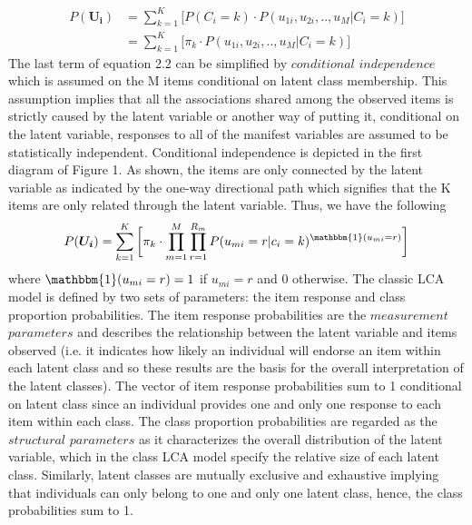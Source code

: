 \begin{align}
P(\bm{U_{i}}) &= \sum_{k=1}^{K} \bigg[ P(C_{i}=k) \cdot P(u_{1i},u_{2i},..,u_{M}|C_{i}=k)\bigg] \\
&=\sum_{k=1}^{K} \bigg[ \pi_{k} \cdot P(u_{1i},u_{2i},..,u_{M}|C_{i}=k)\bigg]
\end{align}
The last term of equation 2.2 can be simplified by $conditional$ $independence$ which is assumed on the M items conditional on latent class membership. This assumption implies that all the associations shared among the observed items is strictly caused by the latent variable or another way of putting it, conditional on the latent variable, responses to all of the manifest variables are assumed to be statistically independent. Conditional independence is depicted in the first diagram of Figure 1. As shown, the items are only connected by the latent variable as indicated by the one-way directional path which signifies that the K items are only related through the latent variable. Thus, we have the following 
\begin{align}
P(\bm{U_{i}}) = \sum_{k=1}^{K} \bigg[ \pi_{k} \cdot  \prod_{m=1}^{M}\prod_{r=1}^{R_{m}} P(u_{mi}=r|c_{i}=k)^{\mathbbm{1}(u_{mi} = r)} \bigg ]
\end{align}
where $\mathbbm{1}(u_{mi} = r)=1$ if $u_{mi}=r$ and $0$ otherwise. The classic LCA model is defined by two sets of parameters: the item response and class proportion probabilities. The item response probabilities are the $measurement$ $parameters$ and describes the relationship between the latent variable and items observed (i.e. it indicates how likely an individual will endorse an item within each latent class and so these results are the basis for the overall interpretation of the latent classes). The vector of item response probabilities sum to 1 conditional on latent class since an individual provides one and only one response to each item within each class. The class proportion probabilities are regarded as the $structural$ $parameters$ as it characterizes the overall distribution of the latent variable, which in the class LCA model specify the relative size of each latent class. Similarly, latent classes are mutually exclusive and exhaustive implying that individuals can only belong to one and only one latent class, hence, the class probabilities sum to 1. 

